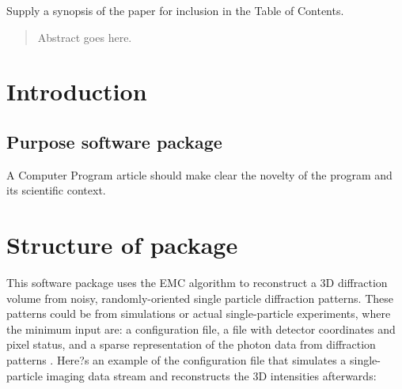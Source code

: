 \documentclass[preprint]{iucr}              %
\begin{document}
\maketitle                        %

\begin{synopsis}
Supply a synopsis of the paper for inclusion in the Table of Contents.
\end{synopsis}

\begin{abstract}
Abstract goes here.
\end{abstract}



\section{Introduction}

\subsection{Purpose software package}
 A Computer Program article should make clear the novelty of the program and its scientific context. 

\section{Structure of package}
This software package uses the EMC algorithm to reconstruct a 3D diffraction volume from noisy, randomly-oriented single particle diffraction patterns. These patterns could be from simulations or actual single-particle experiments, where the minimum input are: a configuration file, a file with detector coordinates and pixel status, and a sparse representation of the photon data from diffraction patterns . Here?s an example of the configuration file that simulates a single-particle imaging data stream and reconstructs the 3D intensities afterwards:
\end{document}
